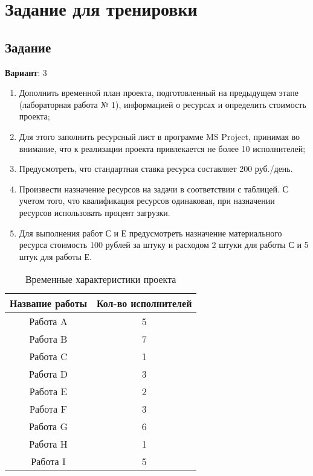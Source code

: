 \chapter{Задание для тренировки}

\section*{Задание}

\textbf{Вариант}: 3

\begin{enumerate}
    \item Дополнить временной план проекта, подготовленный на предыдущем этапе
(лабораторная работа № 1), информацией о ресурсах и определить стоимость
проекта;
    \item Для этого заполнить ресурсный лист в программе MS Project, принимая во
внимание, что к реализации проекта привлекается не более 10 исполнителей;
    \item Предусмотреть, что стандартная ставка ресурса составляет 200 руб./день.
    \item Произвести назначение ресурсов на задачи в соответствии с таблицей. С учетом
того, что квалификация ресурсов одинаковая, при назначении ресурсов
использовать процент загрузки.
    \item Для выполнения работ С и Е предусмотреть назначение материального ресурса
стоимость 100 рублей за штуку и расходом 2 штуки для работы С и 5 штук для
работы Е.
\end{enumerate}

\begin{table}[!h]
    \begin{center}
        \caption{Временные характеристики проекта}
        \begin{tabular}{|c|c|}
            \hline
            \bfseries Название работы & \bfseries Кол-во исполнителей \\\hline
            Работа A & 5 \\
            Работа B & 7 \\
            Работа C & 1 \\
            Работа D & 3 \\
            Работа E & 2 \\
            Работа F & 3 \\
            Работа G & 6 \\
            Работа H & 1 \\
            Работа I & 5 \\\hline
        \end{tabular}
    \end{center}
\end{table}

